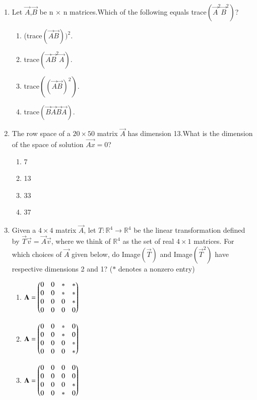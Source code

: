 \renewcommand{\theequation}{\theenumi}
\renewcommand{\thefigure}{\theenumi}
\begin{enumerate}[label=\thesection.\arabic*.,ref=\thesection.\theenumi]

\item Let $\vec{A}$,$\vec{B}$ be n × n matrices.Which of the following equals trace$(\vec{A}^2 \vec{B}^2)$?\\

\begin{enumerate}
\item (trace$(\vec{A} \vec{B}))^2.$
\item trace$(\vec{A} \vec{B}^2 \vec{A}).$
\item trace$((\vec{A} \vec{B})^2).$
\item trace$(\vec{B} \vec{A} \vec{B} \vec{A}).$
\end{enumerate}
%
%
%
\solution

\item The row space of a $20 \times 50$ matrix $\vec{A}$ has dimension 13.What is the dimension of the space of solution $\vec{Ax}=0$?
\begin{enumerate}
\item{7}
\item{13}
\item{33}
\item{37}
\end{enumerate}
%
%
\solution

\item Given a $4 \times 4$ matrix $\vec{A}$, let $T:\mathbb R^4 \rightarrow \mathbb R^4$ be the linear transformation defined by $\vec{T}\vec{v} = \vec{A}\vec{v}$, where we think of $\mathbb R^4$ as the set of real $4 \times 1$ matrices. For which choices of $\vec{A}$ given below, do Image$(\vec{T})$ and Image$(\vec{T}^2)$ have respective dimensions 2 and 1? ($*$ denotes a nonzero entry)
\begin{enumerate}
    \item $\mathbf{A} = \begin{pmatrix}0 & 0 & * & * \\ 0 & 0 & * & * \\ 0 & 0 & 0 & * \\ 0 & 0 & 0 & 0\end{pmatrix}$
    \item $\mathbf{A} = \begin{pmatrix}0 & 0 & * & 0 \\ 0 & 0 & * & 0 \\ 0 & 0 & 0 & * \\ 0 & 0 & 0 & *\end{pmatrix}$
    \item $\mathbf{A} = \begin{pmatrix}0 & 0 & 0 & 0 \\ 0 & 0 & 0 & 0 \\ 0 & 0 & 0 & * \\ 0 & 0 & * & 0\end{pmatrix}$

\end{enumerate}
\end{enumerate}
